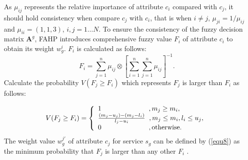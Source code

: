 \documentclass[conference]{IEEEtran}
\begin{document}
\begin{comment}   
\label{equ5}
\boldsymbol{A}^g = {({\mu _{ij}})_{N \times N}}   .
\end{comment}   


As $\mu _{ij}$ represents the relative importance of attribute $c_i$ compared with $c_j$, it should hold consistency when compare $c_j$ with $c_i$, that is when $i \ne j$, $\mu_{ji} = 1 / \mu_{ij}$ and $\mu_{ii}=(1,1,3)$, $i,j=1\dots N$. 
 To ensure the consistency of the fuzzy decision matrix $\boldsymbol{A}^g$, FAHP introduces comprehensive fuzzy value $F_i$ of attribute $c_i$ to obtain its weight $w_g^i$.
$F_i$ is calculated as follows:
\begin{equation}   
\label{equ6}
{F_i} = \sum\limits_{j = 1}^n {{\mu _{ij}}}  \otimes {\left[ {\sum\limits_{i = 1}^n {\sum\limits_{j = 1}^n {{\mu _{ij}}} } } \right]^{ - 1}}    .
\end{equation}  
Calculate the probability $V({F_j} \ge {F_i})$ which represents $F_j$ is larger than $F_i$ as follows: 




\begin{equation}   
\label{equ7}
V({F_j} \ge {F_i}) = \left\{ \begin{array}{l}
1\;\;\;\;\;\;\;\;\;\;\;\;\;\;\;\;\;\;\;\;\;\;\;\;\;,{m_j} \ge {m_i},\\
\frac{{({m_j} - {u_j}) - ({m_j} - {l_i})}}{{{l_j} - {u_i}}}\;\;,{m_j} \le {m_i},{l_i} \le {u_j},\\
0\;\;\;\;\;\;\;\;\;\;\;\;\;\;\;\;\;\;\;\;\;\;\;\;\;,\rm otherwise.
\end{array} \right.   
\end{equation}  
The weight value ${w^{j'}_g}$ of attribute $c_j$ for service $s_g$ can be defined by (\ref{equ8}) as the minimum probability that $F_j$ is larger than any other $F_i$ .
\end{document}

